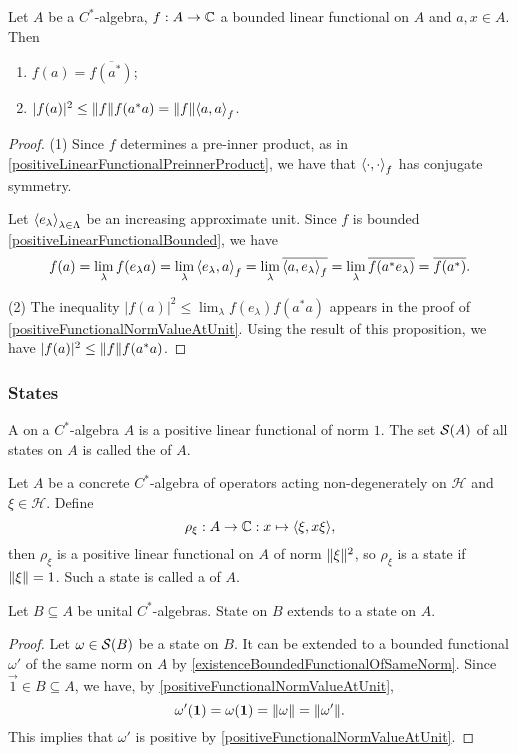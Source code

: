 \begin{lemma}
Let $A$ be a $C^*$-algebra, $f: A\to \mathbb{C}$ a bounded linear functional on $A$ and $a,x\in A$. Then
\begin{enumerate}
\item $f(a) = \overline{f(a^*)}$;
\item $|f(a)|^2 \leq \norm{f}f(a^*a) = \norm{f}\inner{a,a}_f$.
\end{enumerate}
\end{lemma}
\begin{proof}
(1) Since $f$ determines a pre-inner product, as in \ref{positiveLinearFunctionalPreinnerProduct}, we have that $\inner{\cdot,\cdot}_f$ has conjugate symmetry. 

Let $\left\langle e_\lambda \right\rangle_{\lambda\in \Lambda}$ be an increasing approximate unit. Since $f$ is bounded \ref{positiveLinearFunctionalBounded}, we have
\[ f(a) = \lim_{\lambda}f(e_\lambda a) = \lim_{\lambda}\inner{e_\lambda, a}_f = \lim_{\lambda}\overline{\inner{a, e_\lambda}_f} = \lim_{\lambda}\overline{f(a^*e_\lambda)} = \overline{f(a^*)}. \]

(2) The inequality $|f(a)|^2 \leq \lim_\lambda f(e_\lambda) f(a^*a)$ appears in the proof of \ref{positiveFunctionalNormValueAtUnit}. Using the result of this proposition, we have $|f(a)|^2 \leq \lVert f\rVert f(a^*a)$.
\end{proof}

\subsubsection{States}
\begin{definition}
A  on a $C^*$-algebra $A$ is a positive linear functional of norm $1$. The set $\operatorname{\mathcal{S}}(A)$ of all states on $A$ is called the  of $A$.
\end{definition}


\begin{example}
Let $A$ be a concrete $C^*$-algebra of operators acting non-degenerately on $\mathcal{H}$ and $\xi \in \mathcal{H}$. Define
\[ \rho_\xi: A \to \C: x\mapsto \inner{\xi, x\xi}, \]
then $\rho_\xi$ is a positive linear functional on $A$ of norm $\lVert\xi\rVert^2$, so  $\rho_\xi$ is a state if $\lVert\xi\rVert =1$. Such a state is called a  of $A$.
\end{example}

\begin{lemma}
Let $B\subseteq A$ be unital $C^*$-algebras. State on $B$ extends to a state on $A$.
\end{lemma}
\begin{proof}
Let $\omega\in\operatorname{\mathcal{S}}(B)$ be a state on $B$. It can be extended to a bounded functional $\omega'$ of the same norm on $A$ by \ref{existenceBoundedFunctionalOfSameNorm}. Since $\vec{1} \in B\subseteq A$, we have, by \ref{positiveFunctionalNormValueAtUnit},
\[\omega'(\boldsymbol{\mathrm{1}}) = \omega(\boldsymbol{\mathrm{1}}) = \lVert\omega\rVert = \lVert\omega'\rVert. \]
This implies that $\omega'$ is positive by \ref{positiveFunctionalNormValueAtUnit}. 
\end{proof}


